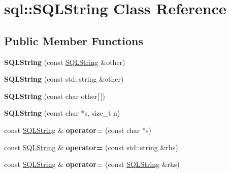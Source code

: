 \hypertarget{classsql_1_1_s_q_l_string}{}\section{sql\+:\+:S\+Q\+L\+String Class Reference}
\label{classsql_1_1_s_q_l_string}
\subsection*{Public Member Functions}
\begin{DoxyCompactItemize}
\item 
\hypertarget{classsql_1_1_s_q_l_string_aa13d55ec3b3df1c841f755e24d4e28c9}{}\label{classsql_1_1_s_q_l_string_aa13d55ec3b3df1c841f755e24d4e28c9} 
{\bfseries S\+Q\+L\+String} (const \hyperlink{classsql_1_1_s_q_l_string}{S\+Q\+L\+String} \&other)
\item 
\hypertarget{classsql_1_1_s_q_l_string_a84644c05a801034d354b8bd10d2d8f72}{}\label{classsql_1_1_s_q_l_string_a84644c05a801034d354b8bd10d2d8f72} 
{\bfseries S\+Q\+L\+String} (const std\+::string \&other)
\item 
\hypertarget{classsql_1_1_s_q_l_string_a2566ad6c873e9c4c075503c2a850c7e5}{}\label{classsql_1_1_s_q_l_string_a2566ad6c873e9c4c075503c2a850c7e5} 
{\bfseries S\+Q\+L\+String} (const char other\mbox{[}$\,$\mbox{]})
\item 
\hypertarget{classsql_1_1_s_q_l_string_acd5dd85fcb890629c319ef55f445a2ac}{}\label{classsql_1_1_s_q_l_string_acd5dd85fcb890629c319ef55f445a2ac} 
{\bfseries S\+Q\+L\+String} (const char $\ast$s, size\+\_\+t n)
\item 
\hypertarget{classsql_1_1_s_q_l_string_adec7c9d6eec34ef339fc9da6e149b841}{}\label{classsql_1_1_s_q_l_string_adec7c9d6eec34ef339fc9da6e149b841} 
const \hyperlink{classsql_1_1_s_q_l_string}{S\+Q\+L\+String} \& {\bfseries operator=} (const char $\ast$s)
\item 
\hypertarget{classsql_1_1_s_q_l_string_a0a7c0cf3ba73ed9a174408be19ea1024}{}\label{classsql_1_1_s_q_l_string_a0a7c0cf3ba73ed9a174408be19ea1024} 
const \hyperlink{classsql_1_1_s_q_l_string}{S\+Q\+L\+String} \& {\bfseries operator=} (const std\+::string \&rhs)
\item 
\hypertarget{classsql_1_1_s_q_l_string_a40a973cbd4d20c436fbb027515e7acf0}{}\label{classsql_1_1_s_q_l_string_a40a973cbd4d20c436fbb027515e7acf0} 
const \hyperlink{classsql_1_1_s_q_l_string}{S\+Q\+L\+String} \& {\bfseries operator=} (const \hyperlink{classsql_1_1_s_q_l_string}{S\+Q\+L\+String} \&rhs)

\end{DoxyCompactItemize}
